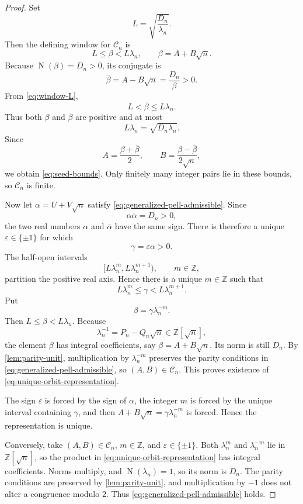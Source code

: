 \documentclass[a4paper,11pt]{amsart}
\theoremstyle{definition}
\theoremstyle{remark}
\newcommand{\Z}{\mathbb Z}
\newcommand{\eps}{\varepsilon}
\newcommand{\Norm}{\operatorname N}
\begin{document}
\begin{proof}
Set
\[
L=\sqrt{\frac{D_n}{\lambda_n}}.
\]
Then the defining window for $\mathcal C_n$ is
\begin{equation}\label{eq:window-L}
L\le\beta<L\lambda_n,
\qquad \beta=A+B\sqrt n.
\end{equation}
Because $\Norm(\beta)=D_n>0$, its conjugate is
\[
\overline\beta=A-B\sqrt n=\frac{D_n}{\beta}>0.
\]
From \eqref{eq:window-L},
\[
L<\overline\beta\le L\lambda_n.
\]
Thus both $\beta$ and $\overline\beta$ are positive and at most
\[
L\lambda_n=\sqrt{D_n\lambda_n}.
\]
Since
\[
A=\frac{\beta+\overline\beta}{2},
\qquad
B=\frac{\beta-\overline\beta}{2\sqrt n},
\]
we obtain \eqref{eq:seed-bounds}.  Only finitely many integer pairs lie in these bounds, so $\mathcal C_n$ is finite.

Now let $\alpha=U+V\sqrt n$ satisfy \eqref{eq:generalized-pell-admissible}.  Since
\[
\alpha\overline\alpha=D_n>0,
\]
the two real numbers $\alpha$ and $\overline\alpha$ have the same sign.  There is therefore a unique $\eps\in\{\pm1\}$ for which
\[
\gamma=\eps\alpha>0.
\]
The half-open intervals
\[
[L\lambda_n^m,L\lambda_n^{m+1}),
\qquad m\in\Z,
\]
partition the positive real axis.  Hence there is a unique $m\in\Z$ such that
\[
L\lambda_n^m\le\gamma<L\lambda_n^{m+1}.
\]
Put
\[
\beta=\gamma\lambda_n^{-m}.
\]
Then $L\le\beta<L\lambda_n$.  Because
\[
\lambda_n^{-1}=P_n-Q_n\sqrt n\in\Z[\sqrt n],
\]
the element $\beta$ has integral coefficients, say $\beta=A+B\sqrt n$.  Its norm is still $D_n$.  By \cref{lem:parity-unit}, multiplication by $\lambda_n^{-m}$ preserves the parity conditions in \eqref{eq:generalized-pell-admissible}, so $(A,B)\in\mathcal C_n$.  This proves existence of \eqref{eq:unique-orbit-representation}.

The sign $\eps$ is forced by the sign of $\alpha$, the integer $m$ is forced by the unique interval containing $\gamma$, and then $A+B\sqrt n=\gamma\lambda_n^{-m}$ is forced.  Hence the representation is unique.

Conversely, take $(A,B)\in\mathcal C_n$, $m\in\Z$, and $\eps\in\{\pm1\}$.  Both $\lambda_n^m$ and $\lambda_n^{-m}$ lie in $\Z[\sqrt n]$, so the product in \eqref{eq:unique-orbit-representation} has integral coefficients.  Norms multiply, and $\Norm(\lambda_n)=1$, so its norm is $D_n$.  The parity conditions are preserved by \cref{lem:parity-unit}, and multiplication by $-1$ does not alter a congruence modulo $2$.  Thus \eqref{eq:generalized-pell-admissible} holds.
\end{proof}
\end{document}
